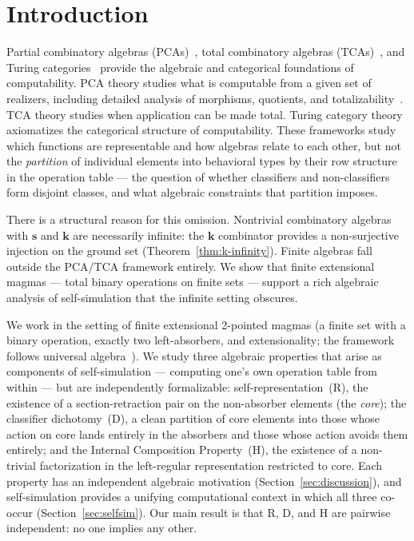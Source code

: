 \documentclass[sigconf,screen,review,anonymous]{acmart}
\theoremstyle{remark}
\begin{document}
\maketitle

\section{Introduction}
\label{sec:introduction}

Partial combinatory algebras (PCAs)~\cite{vanoosten08,longley15}, total combinatory algebras (TCAs)~\cite{bethke88}, and Turing categories~\cite{cockett08} provide the algebraic and categorical foundations of computability. PCA theory studies what is computable from a given set of realizers, including detailed analysis of morphisms, quotients, and totalizability~\cite{bethke96}. TCA theory studies when application can be made total. Turing category theory axiomatizes the categorical structure of computability. These frameworks study which functions are representable and how algebras relate to each other, but not the \emph{partition} of individual elements into behavioral types by their row structure in the operation table --- the question of whether classifiers and non-classifiers form disjoint classes, and what algebraic constraints that partition imposes.

There is a structural reason for this omission. Nontrivial combinatory algebras with $\mathbf{s}$ and $\mathbf{k}$ are necessarily infinite: the $\mathbf{k}$ combinator provides a non-surjective injection on the ground set (Theorem~\ref{thm:k-infinity}). Finite algebras fall outside the PCA/TCA framework entirely. We show that finite extensional magmas --- total binary operations on finite sets --- support a rich algebraic analysis of self-simulation that the infinite setting obscures.

We work in the setting of finite extensional 2-pointed magmas (a finite set with a binary operation, exactly two left-absorbers, and extensionality; the framework follows universal algebra~\cite{burris81}). We study three algebraic properties that arise as components of self-simulation --- computing one's own operation table from within --- but are independently formalizable: self-representation~(R), the existence of a section-retraction pair on the non-absorber elements (the \emph{core}); the classifier dichotomy~(D), a clean partition of core elements into those whose action on core lands entirely in the absorbers and those whose action avoids them entirely; and the Internal Composition Property~(H), the existence of a non-trivial factorization in the left-regular representation restricted to core. Each property has an independent algebraic motivation (Section~\ref{sec:discussion}), and self-simulation provides a unifying computational context in which all three co-occur (Section~\ref{sec:selfsim}). Our main result is that R, D, and H are pairwise independent: no one implies any other.
\end{document}
